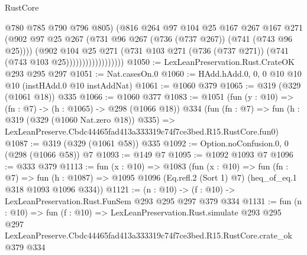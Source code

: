 \begin{lexlean}{RustCore}
\begin{coremodule}
                                @780
                                @785
                                @790
                                @796
                                @805)
                              (@816
                                @264
                                @97
                                @104
                                @25
                                @167
                                @267
                                @167
                                @271
                                (@902
                                  @97
                                  @25
                                  @267
                                  (@731 @96 @267 (@736 (@737 @267)) (@741 (@743 @96 @25))))
                                (@902
                                  @104
                                  @25
                                  @271
                                  (@731
                                    @103
                                    @271
                                    (@736 (@737 @271))
                                    (@741 (@743 @103 @25))))))))))))))))))
@1050 := LexLeanPreservation.Rust.CrateOK @293 @295 @297
@1051 := Nat.casesOn.{0}
@1060 := HAdd.hAdd.{0, 0, 0} @10 @10 @10 (instHAdd.{0} @10 instAddNat)
@1061 := @1060 @379
@1065 := @319 (@329 (@1061 @18)) @335
@1066 := @1060 @377
@1083 := @1051
    (fun (y : @10) => (fn : @7) -> (h : @1065) -> @298 (@1066 @18))
    @334
    (fun (fn : @7) =>
    fun (h : @319 (@329 (@1060 Nat.zero @18)) @335) =>
    LexLeanPreserve.Cbdc44465fad413a333319c74f7ce3bed.R15.RustCore.fun0)
@1087 := @319 (@329 (@1061 @58)) @335
@1092 := Option.noConfusion.{0, 0} (@298 (@1066 @58)) @7
@1093 := @149 @7
@1095 := @1092 @1093 @7
@1096 := @333 @379
@1113 := fun (x : @10) =>
  @1083
    (fun (x : @10) =>
    fun (fn : @7) =>
    fun (h : @1087) => @1095 @1096 (Eq.refl.{2} (Sort 1) @7) (heq_of_eq.{1} @318 @1093 @1096 @334))
@1121 := (n : @10) -> (f : @10) -> LexLeanPreservation.Rust.FunSem @293 @295 @297 @379 @334
@1131 := fun (n : @10) =>
  fun (f : @10) =>
  LexLeanPreservation.Rust.simulate
    @293
    @295
    @297
    LexLeanPreserve.Cbdc44465fad413a333319c74f7ce3bed.R15.RustCore.crate_ok
    @379
    @334
\end{coremodule}
\end{lexlean}
